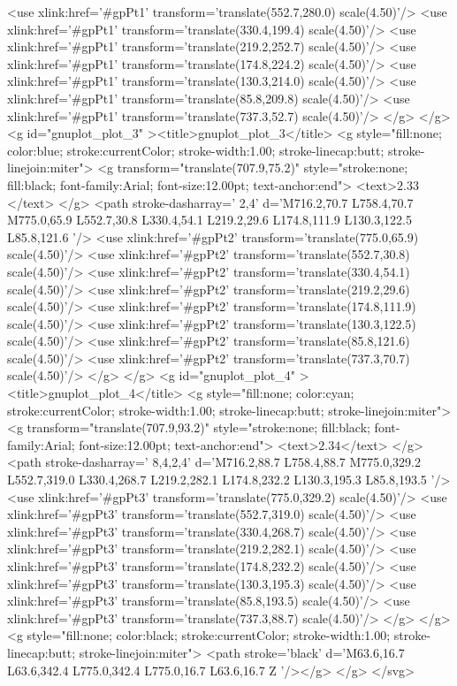 	<use xlink:href='#gpPt1' transform='translate(552.7,280.0) scale(4.50)'/>
	<use xlink:href='#gpPt1' transform='translate(330.4,199.4) scale(4.50)'/>
	<use xlink:href='#gpPt1' transform='translate(219.2,252.7) scale(4.50)'/>
	<use xlink:href='#gpPt1' transform='translate(174.8,224.2) scale(4.50)'/>
	<use xlink:href='#gpPt1' transform='translate(130.3,214.0) scale(4.50)'/>
	<use xlink:href='#gpPt1' transform='translate(85.8,209.8) scale(4.50)'/>
	<use xlink:href='#gpPt1' transform='translate(737.3,52.7) scale(4.50)'/>
</g>
	</g>
	<g id="gnuplot_plot_3" ><title>gnuplot_plot_3</title>
<g style="fill:none; color:blue; stroke:currentColor; stroke-width:1.00; stroke-linecap:butt; stroke-linejoin:miter">
	<g transform="translate(707.9,75.2)" style="stroke:none; fill:black; font-family:Arial; font-size:12.00pt; text-anchor:end">
		<text>$2.33$</text>
	</g>
	<path stroke-dasharray=' 2,4'  d='M716.2,70.7 L758.4,70.7 M775.0,65.9 L552.7,30.8 L330.4,54.1 L219.2,29.6 L174.8,111.9 L130.3,122.5 
		L85.8,121.6  '/>	<use xlink:href='#gpPt2' transform='translate(775.0,65.9) scale(4.50)'/>
	<use xlink:href='#gpPt2' transform='translate(552.7,30.8) scale(4.50)'/>
	<use xlink:href='#gpPt2' transform='translate(330.4,54.1) scale(4.50)'/>
	<use xlink:href='#gpPt2' transform='translate(219.2,29.6) scale(4.50)'/>
	<use xlink:href='#gpPt2' transform='translate(174.8,111.9) scale(4.50)'/>
	<use xlink:href='#gpPt2' transform='translate(130.3,122.5) scale(4.50)'/>
	<use xlink:href='#gpPt2' transform='translate(85.8,121.6) scale(4.50)'/>
	<use xlink:href='#gpPt2' transform='translate(737.3,70.7) scale(4.50)'/>
</g>
	</g>
	<g id="gnuplot_plot_4" ><title>gnuplot_plot_4</title>
<g style="fill:none; color:cyan; stroke:currentColor; stroke-width:1.00; stroke-linecap:butt; stroke-linejoin:miter">
	<g transform="translate(707.9,93.2)" style="stroke:none; fill:black; font-family:Arial; font-size:12.00pt; text-anchor:end">
		<text>$2.34$</text>
	</g>
	<path stroke-dasharray=' 8,4,2,4'  d='M716.2,88.7 L758.4,88.7 M775.0,329.2 L552.7,319.0 L330.4,268.7 L219.2,282.1 L174.8,232.2 L130.3,195.3 
		L85.8,193.5  '/>	<use xlink:href='#gpPt3' transform='translate(775.0,329.2) scale(4.50)'/>
	<use xlink:href='#gpPt3' transform='translate(552.7,319.0) scale(4.50)'/>
	<use xlink:href='#gpPt3' transform='translate(330.4,268.7) scale(4.50)'/>
	<use xlink:href='#gpPt3' transform='translate(219.2,282.1) scale(4.50)'/>
	<use xlink:href='#gpPt3' transform='translate(174.8,232.2) scale(4.50)'/>
	<use xlink:href='#gpPt3' transform='translate(130.3,195.3) scale(4.50)'/>
	<use xlink:href='#gpPt3' transform='translate(85.8,193.5) scale(4.50)'/>
	<use xlink:href='#gpPt3' transform='translate(737.3,88.7) scale(4.50)'/>
</g>
	</g>
<g style="fill:none; color:black; stroke:currentColor; stroke-width:1.00; stroke-linecap:butt; stroke-linejoin:miter">
	<path stroke='black'  d='M63.6,16.7 L63.6,342.4 L775.0,342.4 L775.0,16.7 L63.6,16.7 Z  '/></g>
</g>
</svg>

